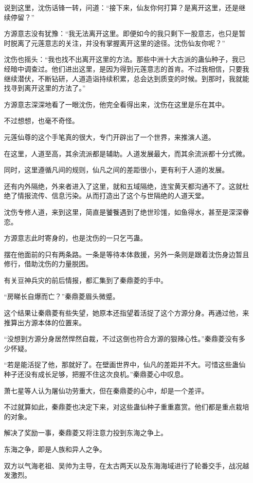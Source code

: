 \begin{this_body}
说到这里，沈伤话锋一转，问道：“接下来，仙友你何打算？是离开这里，还是继续停留？”

方源意志没有犹豫：“我无法离开这里。即便如今的我只剩下一股意志，也只是暂时脱离了元莲意志的关注，并没有掌握离开这里的途径。沈伤仙友你呢？”

沈伤也摇头：“我也找不出离开这里的方法。那些中洲十大古派的蛊仙种子，我已经暗中调查过。他们进出这里，是因为得到元莲意志的首肯。不过我相信，只要我继续潜伏，不断钻研，人道造诣持续积累，总会达到质变的时候。到那时，我就能找寻到离开这里的方法了。”

方源意志深深地看了一眼沈伤，他完全看得出来，沈伤在这里是乐在其中。

不过想想，也毫不奇怪。

元莲仙尊的这个手笔真的很大，专门开辟出了一个世界，来推演人道。

在这里，人道至高，其余流派都是辅助。人道发展最大，而其余流派都十分式微。

同时，这里遵循凡间的规则，仙凡之间的差距很小，更有利于人道的发展。

还有内外隔绝，外来者进入了这里，就和五域隔绝，连宝黄天都沟通不了。这就杜绝了情报流传、信息污染。从而打造出了这个与世隔绝的人道天堂。

沈伤专修人道，来到这里，简直是饕餮遇到了绝世珍馐，如鱼得水，甚至是深深眷恋。

方源意志此时寄身的，也是沈伤的一只乞丐蛊。

摆在他面前的只有两条路。一条是等待本体救援，另外一条则是跟着沈伤身边暂且修行，借助沈伤的力量脱困。

有关豆神兵灾的前后情报，都汇集到了秦鼎菱的手中。

“房睇长自爆而亡？”秦鼎菱眉头微蹙。

这个结果让秦鼎菱有些失望，她原本还指望着活捉了这个方源分身。再通过他，来推算出方源本体的位置来。

“没想到方源分身居然悍然自裁，不过这倒也符合方源的狠辣心性。”秦鼎菱没有多少怀疑。

“若是能活捉了他，那就好了。在壁画世界中，仙凡的差距并不大。可惜这些蛊仙种子还没有成长足够，把握不住这次良机。”秦鼎菱心中叹息。

萧七星等人认为屠仙功劳重大，但在秦鼎菱的心中，却是一个差评。

不过就算如此，秦鼎菱也决定下来，对这些蛊仙种子重重嘉赏。他们都是重点栽培的对象。

解决了奖励一事，秦鼎菱又将注意力投到东海之争上。

东海之争，即是人族和异人之争。

双方以气海老祖、吴帅为主导，在太古两天以及东海海域进行了轮番交手，战况越发激烈。


\end{this_body}

